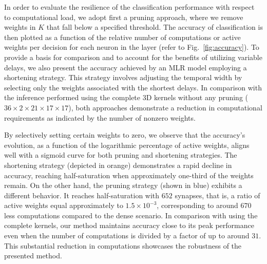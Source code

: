 \documentclass[default]{sn-jnl}%
\theoremstyle{thmstyleone}%
\theoremstyle{thmstyletwo}%
\theoremstyle{thmstylethree}%
\newcommand{\kernel}{K} %
\begin{document}
In order to evaluate the resilience of the classification performance with respect to computational load, we adopt first a pruning approach, where we remove weights in $\kernel$ that fall below a specified threshold. The accuracy of classification is then plotted as a function of the relative number of computations or active weights per decision for each neuron in the layer (refer to Fig.~\ref{fig:accuracy}). To provide a basis for comparison and to account for the benefits of utilizing variable delays, we also present the accuracy achieved by an MLR model employing a shortening strategy. This strategy involves adjusting the temporal width by selecting only the weights associated with the shortest delays. In comparison with the inference performed using the complete 3D kernels without any pruning ($36\times2\times21\times17\times17$), both approaches demonstrate a reduction in computational requirements as indicated by the number of nonzero weights.

By selectively setting certain weights to zero, we observe that the accuracy's evolution, as a function of the logarithmic percentage of active weights, aligns well with a sigmoid curve for both pruning and shortening strategies. The shortening strategy (depicted in orange) demonstrates a rapid decline in accuracy, reaching half-saturation when approximately one-third of the weights remain. On the other hand, the pruning strategy (shown in blue) exhibits a different behavior. It reaches half-saturation with $652$ synapses, that is, a ratio of active weights equal approximately to $1.5\times 10^{-3}$, corresponding to around $670$ less computations compared to the dense scenario. In comparison with using the complete kernels, our method maintains accuracy close to its peak performance even when the number of computations is divided by a factor of up to around $31$. This substantial reduction in computations showcases the robustness of the presented method.
%
%
%
\end{document}
